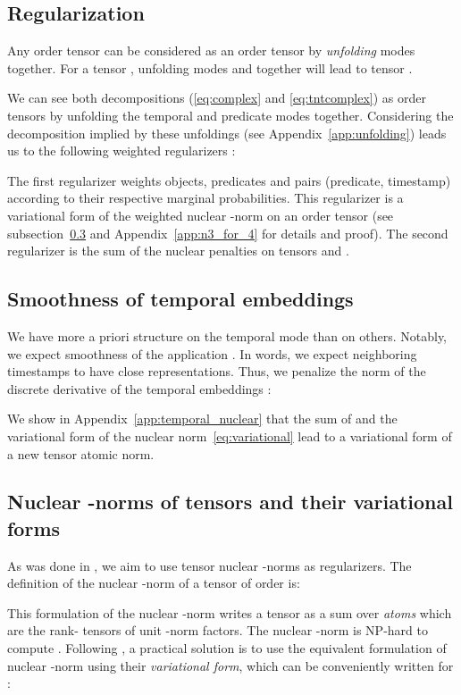 \documentclass{article}
\begin{document}
\subsection{Regularization}
\label{sec:reg}
Any order  tensor can be considered as an order  tensor by \emph{unfolding} modes together. For a tensor , unfolding modes  and  together will lead to tensor  \citep{kolda_tensor_2009}.

We can see both decompositions (\eqref{eq:complex} and \eqref{eq:tntcomplex}) as order  tensors by unfolding the temporal and predicate modes together. Considering the decomposition implied by these unfoldings (see Appendix~\ref{app:unfolding}) leads us to the following weighted regularizers \citep{lacroix2018canonical}:

The first regularizer weights objects, predicates and pairs (predicate, timestamp) according to their respective marginal probabilities. This regularizer is a variational form of the weighted nuclear -norm on an order  tensor (see subsection~\ref{sec:variational} and Appendix~\ref{app:n3_for_4} for details and proof).
The second regularizer is the sum of the nuclear  penalties on tensors  and .

\subsection{Smoothness of temporal embeddings}
\label{sec:grad_penalty}
We have more a priori structure on the temporal mode than on others. Notably, we expect smoothness of the application . In words, we expect neighboring timestamps to have close representations. Thus, we penalize the norm of the discrete derivative of the temporal embeddings :

We show in Appendix~\ref{app:temporal_nuclear} that the sum of  and the variational form of the nuclear  norm~\eqref{eq:variational} lead to a variational form of a new tensor atomic norm.

\subsection{Nuclear -norms of tensors and their variational forms}
\label{sec:variational}
As was done in \citet{lacroix2018canonical}, we aim to use tensor nuclear -norms as regularizers. The definition of the nuclear -norm of a tensor \citep{friedland_nuclear_2014} of order  is:

This formulation of the nuclear -norm writes a tensor as a sum over \emph{atoms} which are the rank- tensors of unit -norm factors.  The nuclear -norm is NP-hard to compute \citep{friedland_nuclear_2014}. Following \citet{lacroix2018canonical}, a practical solution is to use the equivalent formulation of nuclear -norm using their \emph{variational form}, which can be conveniently written for :
\end{document}
